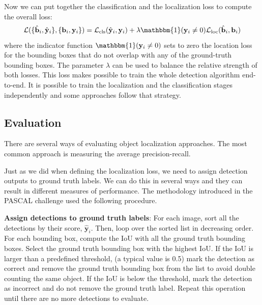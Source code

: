 Now we can put together the classification and the localization loss to compute the overall loss:
\begin{equation}
    \mathcal{L}( \{\hat{\mathbf{b}}_i, \hat{\mathbf{y}}_i\}, \{\mathbf{b}_i, \mathbf{y}_i\})
     =  \mathcal{L}_{\text{cls}}(\hat{\mathbf{y}}_i, \mathbf{y}_i) +
     \lambda \mathbbm{1} (\mathbf{y}_i \neq 0)
     \mathcal{L}_{\text{loc}} 
     (\hat{\mathbf{b}}_i, \mathbf{b}_i)
\end{equation}
where the indicator function $\mathbbm{1} (\mathbf{y}_i \neq 0)$ sets to zero the location loss for the bounding boxes that do not overlap with any of the ground-truth bounding boxes. The parameter $\lambda$ can be used to balance the relative strength of both losses. This loss makes possible to train the whole detection algorithm end-to-end. It is possible to train the localization and the classification stages independently and some approaches follow that strategy. 



\subsection{Evaluation}

There are several ways of evaluating object localization approaches. The most common approach is measuring the average precision-recall. 

Just as we did when defining the localization loss, we need to assign detection outputs to ground truth labels. We can do this in several ways and they can result in different measures of performance. The methodology introduced in the PASCAL challenge used the following procedure. 

{\bf Assign detections to ground truth labels}: For each image, sort all the detections by their score, $\hat{\mathbf{y}}_i$. Then, loop over the sorted list in decreasing order. For each bounding box, compute the IoU with all the ground truth bounding boxes. Select the ground truth bounding box with the highest IoU. If the IoU is larger than a predefined threshold, (a typical value is 0.5) mark the detection as correct and remove the ground truth bounding box from the list to avoid double counting the same object. If the IoU is below the threshold, mark the detection as incorrect and do not remove the ground truth label. Repeat this operation until there are no more detections to evaluate. 

